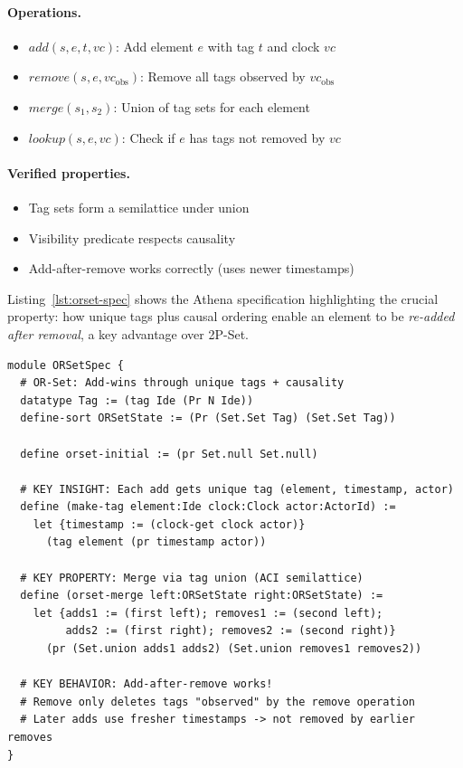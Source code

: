 \paragraph{Operations.}
\begin{itemize}
  \item $\mathit{add}(s, e, t, vc)$: Add element $e$ with tag $t$ and clock $vc$
  \item $\mathit{remove}(s, e, vc_{\text{obs}})$: Remove all tags observed by $vc_{\text{obs}}$
  \item $\mathit{merge}(s_1, s_2)$: Union of tag sets for each element
  \item $\mathit{lookup}(s, e, vc)$: Check if $e$ has tags not removed by $vc$
\end{itemize}

\paragraph{Verified properties.}
\begin{itemize}
  \item Tag sets form a semilattice under union
  \item Visibility predicate respects causality
  \item Add-after-remove works correctly (uses newer timestamps)
\end{itemize}

Listing~\ref{lst:orset-spec} shows the Athena specification highlighting the crucial property: how unique tags plus causal ordering enable an element to be \emph{re-added after removal}, a key advantage over 2P-Set.

\begin{lstlisting}[language=Athena,style=athena,label={lst:orset-spec},caption={OR-Set specification with add-after-remove property}]
module ORSetSpec {
  # OR-Set: Add-wins through unique tags + causality
  datatype Tag := (tag Ide (Pr N Ide))
  define-sort ORSetState := (Pr (Set.Set Tag) (Set.Set Tag))
  
  define orset-initial := (pr Set.null Set.null)
  
  # KEY INSIGHT: Each add gets unique tag (element, timestamp, actor)
  define (make-tag element:Ide clock:Clock actor:ActorId) :=
    let {timestamp := (clock-get clock actor)}
      (tag element (pr timestamp actor))
  
  # KEY PROPERTY: Merge via tag union (ACI semilattice)
  define (orset-merge left:ORSetState right:ORSetState) :=
    let {adds1 := (first left); removes1 := (second left);
         adds2 := (first right); removes2 := (second right)}
      (pr (Set.union adds1 adds2) (Set.union removes1 removes2))
  
  # KEY BEHAVIOR: Add-after-remove works!
  # Remove only deletes tags "observed" by the remove operation
  # Later adds use fresher timestamps -> not removed by earlier removes
}
\end{lstlisting}

